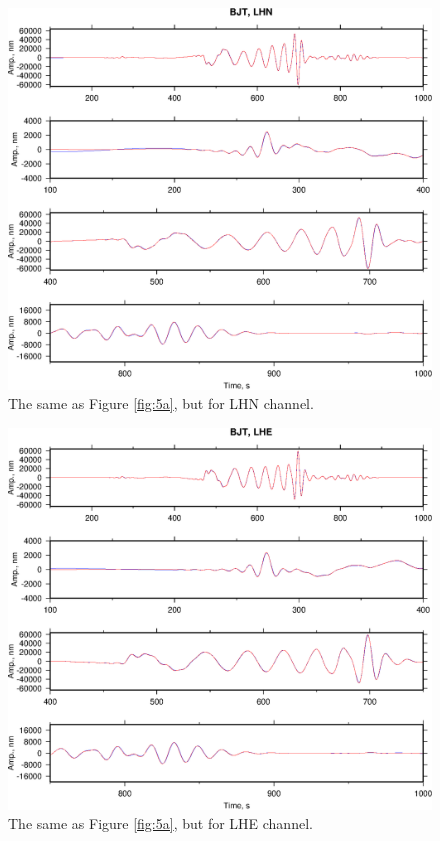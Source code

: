 \begin{figure}
\begin{center}
\includegraphics[width=7 in]{Figures/FigsBJTLHN}
\caption{ The same as Figure \ref{fig:5a}, but for LHN channel.}
\label{fig:6a}
\end{center}
\end{figure}

\begin{figure}
\begin{center}
\includegraphics[width=7 in]{Figures/FigsBJTLHE}
\caption{The same as Figure \ref{fig:5a}, but for LHE channel.}
\label{fig:7a}
\end{center}
\end{figure}

